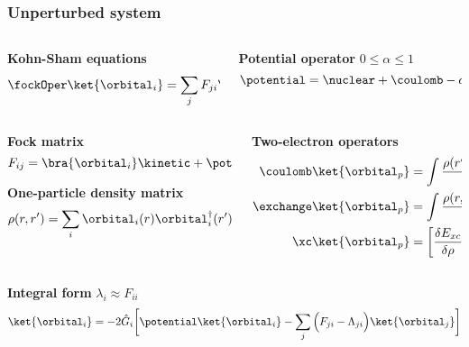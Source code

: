 \begin{frame}
    \frametitle{Unperturbed system}
    \begin{columns}
    \begin{column}[b]{0.5\linewidth}
    \centering
    \textbf{Kohn-Sham equations}
    \begin{equation}
        \nonumber
        \fockOper\ket{\orbital_i} = \sum_j F_{ji}\ket{\orbital_j}
    \end{equation}
    \end{column}
    \begin{column}[b]{0.5\linewidth}
    \centering
    \textbf{Potential operator} $0 \leq \alpha \leq 1$
    \begin{equation}
        \nonumber
        \potential = \nuclear + \coulomb - \alpha\exchange + \xc
    \end{equation}
    \end{column}
    \end{columns}

    \vspace{5mm}

    \begin{columns}
    \begin{column}[b]{0.5\linewidth}
    \centering
    \textbf{Fock matrix}
    \begin{equation}
        \nonumber
        F_{ij} = \bra{\orbital_i}\kinetic + \potential\ket{\orbital_j}
    \end{equation}

    \vspace{8mm}

    \textbf{One-particle density matrix}
    \begin{equation}
        \nonumber
        \rho(r,r') = \sum_i \orbital_i(r)\orbital_i^\dag(r')
    \end{equation}
    \end{column}
    \begin{column}[b]{0.5\linewidth}

    \centering
    \textbf{Two-electron operators}
    \begin{align}
        \nonumber
        \coulomb \ket{\orbital_p} &= \int\frac{\rho(r',r')\orbital_p(r)}{|r-r'|} \ud r'\\
        \nonumber
        \exchange \ket{\orbital_p} &= \int\frac{\rho(r,r')\orbital_p(r')}{|r-r'|} \ud r'\\
        \nonumber
        \xc \ket{\orbital_p} &= \bigg[\frac{\delta E_{xc}}{\delta \rho}\big[\rho(r,r)\big]\bigg] \orbital_p(r) 
    \end{align}
    \end{column}
    \end{columns}

    \vspace{5mm}

    \centering
    \textbf{Integral form} $\lambda_{i} \approx F_{ii}$
    \begin{equation}
        \nonumber
        \ket{\orbital_i} = -2\hat{G}_i\bigg[\potential\ket{\orbital_i} -
        \sum_j \Big(F_{ji} - \Lambda_{ji}\Big)\ket{\orbital_j}\bigg]
    \end{equation}
\end{frame}

